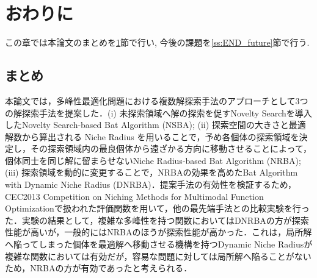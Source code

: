 \documentclass[a4j,11pt]{jarticle}
\def\proposed{DNRBA}
\begin{document}


\clearpage
\section{おわりに}
\label{sec:END}
この章では本論文のまとめを\ref{sec:END}節で行い, 今後の課題を\ref{ss:END_future}節で行う.

\subsection{まとめ}
\label{ss:Conclusion}
本論文では，多峰性最適化問題における複数解探索手法のアプローチとして3つの解探索手法を提案した．(i) 未探索領域へ解の探索を促すNovelty Searchを導入したNovelty Search-based Bat Algorithm (NSBA); (ii) 探索空間の大きさと最適解数から算出される Niche Radius を用いることで，予め各個体の探索領域を決定し，その探索領域内の最良個体から遠ざかる方向に移動させることによって，個体同士を同じ解に留まらせないNiche Radius-based Bat Algorithm (NRBA); (iii) 探索領域を動的に変更することで，NRBAの効果を高めたBat Algorithm with Dynamic Niche Radius (DNRBA)．提案手法の有効性を検証するため，CEC2013 Competition on Niching Methods for Multimodal Function Optimizationで扱われた評価関数を用いて，他の最先端手法との比較実験を行った．実験の結果として，複雑な多峰性を持つ関数においてはDNRBAの方が探索性能が高いが，一般的にはNRBAのほうが探索性能が高かった．これは，局所解へ陥ってしまった個体を最適解へ移動させる機構を持つDynamic Niche Radiusが複雑な関数においては有効だが，容易な問題に対しては局所解へ陥ることがないため，NRBAの方が有効であったと考えられる．


\end{document}
